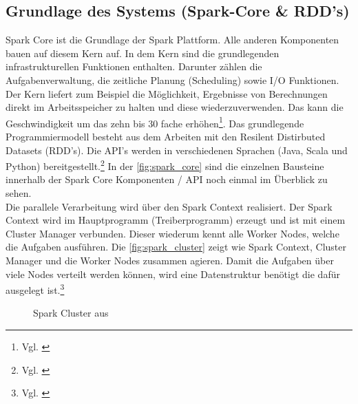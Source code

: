 \newpage
\subsection{Grundlage des Systems (Spark-Core \& RDD’s)}\label{sec_sparkcore}
Spark Core ist die Grundlage der Spark Plattform. Alle anderen Komponenten bauen auf diesem Kern auf. In dem Kern sind die grundlegenden infrastrukturellen Funktionen enthalten. Darunter zählen die Aufgabenverwaltung, die zeitliche Planung (Scheduling) sowie I/O Funktionen.
Der Kern liefert zum Beispiel die Möglichkeit, Ergebnisse von Berechnungen direkt im Arbeitsspeicher zu halten und diese wiederzuverwenden. Das kann die Geschwindigkeit um das zehn bis 30 fache erhöhen\footnote{Vgl. \cite{VYL+16}}. 
Das grundlegende Programmiermodell besteht aus dem Arbeiten mit den Resilent Distirbuted Datasets (RDD's). Die API's werden in verschiedenen Sprachen (Java, Scala und Python) bereitgestellt.\footnote{Vgl. \cite{DATABRICK_ABOUT}} In der \autoref{fig:spark_core} sind die einzelnen Bausteine innerhalb der Spark Core Komponenten / API noch einmal im Überblick zu sehen. \\
 

\noindent
Die parallele Verarbeitung wird über den Spark Context realisiert. Der Spark Context wird im Hauptprogramm (Treiberprogramm) erzeugt und ist mit einem Cluster Manager verbunden. Dieser wiederum kennt alle Worker Nodes, welche die Aufgaben ausführen. Die \autoref{fig:spark_cluster} zeigt wie Spark Context, Cluster Manager und die Worker Nodes zusammen agieren. Damit die Aufgaben über viele Nodes verteilt werden können, wird eine Datenstruktur benötigt die dafür ausgelegt ist.\footnote{Vgl. \cite[101]{BDS16}}

\begin{figure}[h]
  \centering
  \caption{Spark Cluster aus \cite{SPCLUSTER}}\label{fig:spark_cluster}
\end{figure}



